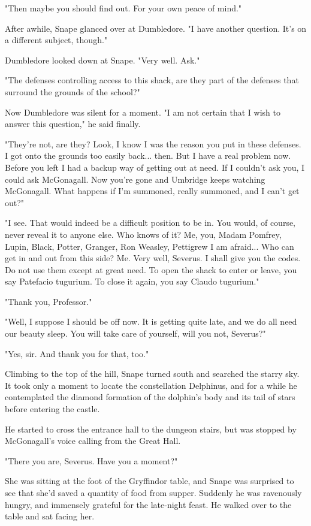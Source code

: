 "Then maybe you should find out. For your own peace of mind."

After awhile, Snape glanced over at Dumbledore. "I have another question. It's on a different subject, though."

Dumbledore looked down at Snape. "Very well. Ask."

"The defenses controlling access to this shack, are they part of the defenses that surround the grounds of the school?"

Now Dumbledore was silent for a moment. "I am not certain that I wish to answer this question," he said finally.

"They're not, are they? Look, I know I was the reason you put in these defenses. I got onto the grounds too easily back... then. But I have a real problem now. Before you left I had a backup way of getting out at need. If I couldn't ask you, I could ask McGonagall. Now you're gone and Umbridge keeps watching McGonagall. What happens if I'm summoned, really summoned, and I can't get out?"

"I see. That would indeed be a difficult position to be in. You would, of course, never reveal it to anyone else. Who knows of it? Me, you, Madam Pomfrey, Lupin, Black, Potter, Granger, Ron Weasley, Pettigrew I am afraid... Who can get in and out from this side? Me. Very well, Severus. I shall give you the codes. Do not use them except at great need. To open the shack to enter or leave, you say Patefacio tugurium. To close it again, you say Claudo tugurium."

"Thank you, Professor."

"Well, I suppose I should be off now. It is getting quite late, and we do all need our beauty sleep. You will take care of yourself, will you not, Severus?"

"Yes, sir. And thank you for that, too."

Climbing to the top of the hill, Snape turned south and searched the starry sky. It took only a moment to locate the constellation Delphinus, and for a while he contemplated the diamond formation of the dolphin's body and its tail of stars before entering the castle.

He started to cross the entrance hall to the dungeon stairs, but was stopped by McGonagall's voice calling from the Great Hall.

"There you are, Severus. Have you a moment?"

She was sitting at the foot of the Gryffindor table, and Snape was surprised to see that she'd saved a quantity of food from supper. Suddenly he was ravenously hungry, and immensely grateful for the late-night feast. He walked over to the table and sat facing her.

